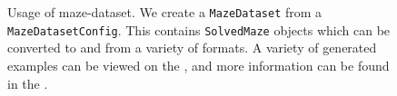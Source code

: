 \begin{figure} 
	\resizebox{\linewidth}{!}{
    	
	}
	\caption{
	  Usage of maze-dataset. We create a \texttt{MazeDataset} from a \texttt{MazeDatasetConfig}. This contains \texttt{SolvedMaze} objects which can be converted to and from a variety of formats. A variety of generated examples can be viewed on the , and more information can be found in the .
	}
	\label{fig:diagram}
\end{figure}